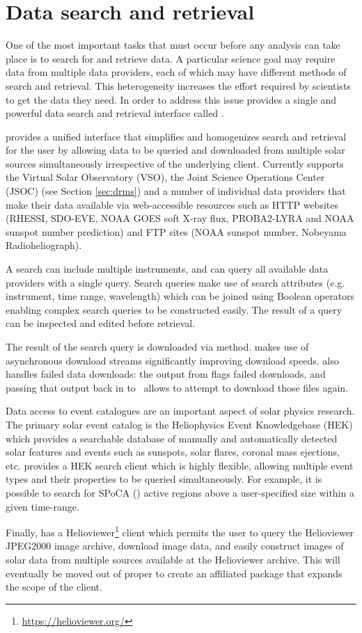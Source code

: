 \section{Data search and retrieval}
\label{sec:fido}

One of the most important tasks that must occur before any analysis can take place is to search for and retrieve data.
A particular science goal may require data from multiple data providers, each of which may have different methods of search and retrieval.
This heterogeneity increases the effort required by scientists to get the data they need.
In order to address this issue \sunpypkg provides a single and powerful data search and retrieval interface called \Fido. 

\Fido provides a unified interface that simplifies and homogenizes search and retrieval for the user by allowing data to be queried and downloaded from multiple solar sources simultaneously irrespective of the underlying client.
Currently \Fido supports the Virtual Solar Observatory (VSO), the Joint Science Operations Center (JSOC) (see Section \ref{sec:drms}) and a number of individual data providers that make their data available via web-accessible resources such as HTTP websites (RHESSI, SDO-EVE, NOAA GOES soft X-ray flux, PROBA2-LYRA and NOAA sunspot number prediction) and FTP sites (NOAA sunspot number, Nobeyama Radioheliograph).

A \Fido search can include multiple instruments, and can query all available data providers with a single query.
Search queries make use of search attributes (e.g. instrument, time range, wavelength) which can be joined using Boolean operators enabling complex search queries to be constructed easily.
The result of a query can be inspected and edited before retrieval.

The result of the \Fido search query is downloaded via  method. \Fido makes use of asynchronous download streams significantly improving download speeds.
\Fido also handles failed data downloads: the output from  flags failed downloads, and passing that output back in to \ allows \Fido to attempt to download those files again.

Data access to event catalogues are an important aspect of solar physics research. 
The primary solar event catalog is the Heliophysics Event Knowledgebase (HEK) which provides a searchable database of manually and automatically detected solar features and events such as sunspots, solar flares, coronal mass ejections, etc. \sunpypkg provides a HEK search client which is highly flexible, allowing multiple event types and their properties to be queried simultaneously.
For example, it is possible to search for SPoCA (\cite{2014AA...561A..29V}) active regions above a user-specified size within a given time-range.

Finally, \sunpypkg has a Helioviewer\footnote{\url{https://helioviewer.org/}} client which permits the user to query the Helioviewer JPEG2000 image archive, download image data, and easily construct images of solar data from multiple sources available at the Helioviewer archive.
This will eventually  be moved out of \sunpypkg proper to create an affiliated package that expands the scope of the client.
